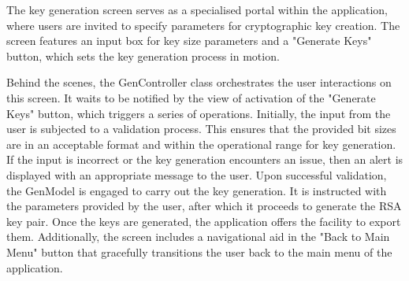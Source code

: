 \documentclass[]{final_report}
\theoremstyle{definition}
\begin{document}
The key generation screen serves as a specialised portal within the application, where users are invited to specify parameters for cryptographic key creation. The screen features an input box for key size parameters and a "Generate Keys" button, which sets the key generation process in motion.

Behind the scenes, the GenController class orchestrates the user interactions on this screen. It waits to be notified by the view of activation of the "Generate Keys" button, which triggers a series of operations. Initially, the input from the user is subjected to a validation process. This ensures that the provided bit sizes are in an acceptable format and within the operational range for key generation. If the input is incorrect or the key generation encounters an issue, then an alert is displayed with an appropriate message to the user. 
Upon successful validation, the GenModel is engaged to carry out the key generation. It is instructed with the parameters provided by the user, after which it proceeds to generate the RSA key pair. Once the keys are generated, the application offers the facility to export them. Additionally, the screen includes a navigational aid in the "Back to Main Menu" button that gracefully transitions the user back to the main menu of the application.
\end{document}
